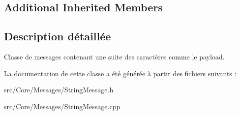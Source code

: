 \subsection*{Additional Inherited Members}


\subsection{Description détaillée}
Classe de messages contenant une suite des caractères comme le payload. 

La documentation de cette classe a été générée à partir des fichiers suivants \-:\begin{DoxyCompactItemize}
\item 
src/\-Core/\-Messages/String\-Message.\-h\item 
src/\-Core/\-Messages/String\-Message.\-cpp\end{DoxyCompactItemize}
